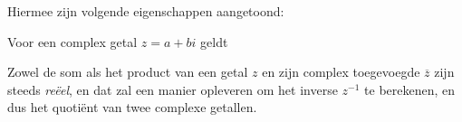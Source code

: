 \documentclass{ximera}
\begin{document}
Hiermee zijn volgende eigenschappen aangetoond:

\begin{proposition}\label{eig:complex_toegevoegde}
Voor een complex getal $z=a+bi$ geldt 

\vspace{-3mm}

\vspace{-3mm}

\vspace{-3mm}

\end{proposition}

Zowel de som als het product van een getal $z$ en zijn complex toegevoegde $\overline{z}$ zijn steeds \textit{reëel}, en dat zal een manier opleveren om het inverse $z^{-1}$ te berekenen, en dus het quotiënt van twee complexe getallen.
\end{document}
